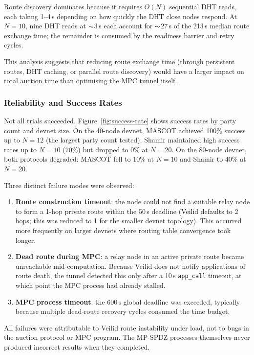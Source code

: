Route discovery dominates because it requires $O(N)$ sequential DHT reads,
each taking 1--4\,s depending on how quickly the DHT close nodes respond.
At $N{=}10$, nine DHT reads at ${\thicksim}$3\,s each account for ${\thicksim}$27\,s
of the 213\,s median route exchange time; the remainder is consumed by the
readiness barrier and retry cycles.

This analysis suggests that reducing route exchange time (through
persistent routes, DHT caching, or parallel route discovery) would
have a larger impact on total auction time than optimising the MPC tunnel
itself.

\subsubsection{Reliability and Success Rates}

Not all trials succeeded.  Figure~\ref{fig:success-rate} shows success rates
by party count and devnet size.  On the 40-node devnet, MASCOT achieved
100\% success up to $N{=}12$ (the largest party count tested).  Shamir
maintained high success rates up to $N{=}10$ (70\%) but dropped to 0\% at
$N{=}20$.  On the 80-node devnet, both protocols degraded: MASCOT fell to
10\% at $N{=}10$ and Shamir to 40\% at $N{=}20$.

Three distinct failure modes were observed:
\begin{enumerate}[noitemsep]
  \item \textbf{Route construction timeout}: the node could not find a
    suitable relay node to form a 1-hop private route within the 50\,s
    deadline (Veilid defaults to 2 hops; this was reduced to 1 for the
    smaller devnet topology).  This occurred more frequently on larger
    devnets where routing table convergence took longer.
  \item \textbf{Dead route during MPC}: a relay node in an active private
    route became unreachable mid-computation.  Because Veilid does not
    notify applications of route death, the tunnel detected this only after
    a 10\,s \texttt{app\_call} timeout, at which point the MPC process had
    already stalled.
  \item \textbf{MPC process timeout}: the 600\,s global deadline was
    exceeded, typically because multiple dead-route recovery cycles consumed
    the time budget.
\end{enumerate}

All failures were attributable to Veilid route instability under load, not
to bugs in the auction protocol or MPC program.  The MP-SPDZ processes
themselves never produced incorrect results when they completed.

